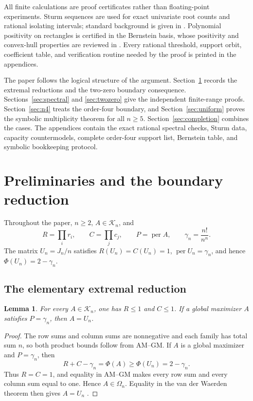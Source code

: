 \documentclass[11pt]{amsart}
\newtheorem{lemma}[theorem]{Lemma}
\theoremstyle{definition}
\theoremstyle{remark}
\begin{document}
All finite calculations are proof certificates rather than floating-point
experiments.  Sturm sequences are used for exact univariate root counts
and rational isolating intervals; standard background is given in
\cite{BasuPollackRoy}.  Polynomial positivity on rectangles is certified
in the Bernstein basis, whose positivity and convex-hull properties are
reviewed in \cite{Farouki}.  Every rational threshold, support orbit,
coefficient table, and verification routine needed by the proof is printed
in the appendices.

The paper follows the logical structure of the argument.
Section~\ref{sec:prelim} records the extremal reductions and the two-zero
boundary consequence.  Sections~\ref{sec:spectral} and
\ref{sec:twozero} give the independent finite-range proofs.
Section~\ref{sec:n4} treats the order-four boundary, and
Section~\ref{sec:uniform} proves the symbolic multiplicity theorem for all
\(n\geq5\).  Section~\ref{sec:completion} combines the cases.  The
appendices contain the exact rational spectral checks, Sturm data,
capacity countermodels, complete order-four support list, Bernstein table,
and symbolic bookkeeping protocol.

\section{Preliminaries and the boundary reduction}\label{sec:prelim}

Throughout the paper, \(n\geq2\), \(A\in\mathcal K_n\), and
\[
 R=\prod_i r_i,\qquad C=\prod_j c_j,\qquad
 P=\operatorname{per}A,\qquad
 \gamma_n=\frac{n!}{n^n}.
\]
The matrix \(U_n=J_n/n\) satisfies
\(R(U_n)=C(U_n)=1\), \(\operatorname{per}U_n=\gamma_n\), and hence
\(\Phi(U_n)=2-\gamma_n\).

\subsection{The elementary extremal reduction}

\begin{lemma}\label{lem:amgm-vdw}
For every \(A\in\mathcal K_n\), one has \(R\leq1\) and \(C\leq1\).
If a global maximizer \(A\) satisfies \(P=\gamma_n\), then \(A=U_n\).
\end{lemma}

\begin{proof}
The row sums and column sums are nonnegative and each family has total
sum \(n\), so both product bounds follow from AM--GM.  If \(A\) is a
global maximizer and \(P=\gamma_n\), then
\[
 R+C-\gamma_n=\Phi(A)\geq\Phi(U_n)=2-\gamma_n.
\]
Thus \(R=C=1\), and equality in AM--GM makes every row sum and every
column sum equal to one.  Hence \(A\in\Omega_n\).  Equality in the van der
Waerden theorem then gives \(A=U_n\) \cite{Egorychev}.
\end{proof}
\end{document}
